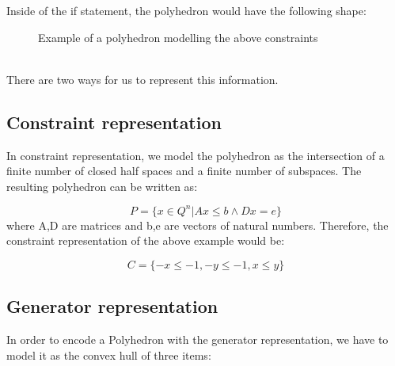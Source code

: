 Inside of the if statement, the polyhedron would have the following shape:

\begin{figure}[h]
\begin{center}
	\caption{Example of a polyhedron modelling the above constraints}

\end{center}
\end{figure}
\mbox{}\\

There are two ways for us to represent this information.
\subsection{Constraint representation}
In constraint representation, we model the polyhedron as the intersection of a finite number of closed half spaces and a finite number of subspaces. The resulting polyhedron can be written as:

\begin{equation}
    P=\{x\in Q^n |Ax\leq b \wedge Dx=e\}
\end{equation}
where A,D are matrices and b,e are vectors of natural numbers. Therefore, the constraint representation of the above example would be:

\begin{equation}
    C = \{-x \leq -1, -y \leq -1, x\leq y \} 
\end{equation}

\subsection{Generator representation}
In order to encode a Polyhedron with the generator representation, we have to model it as the convex hull of three items: 

